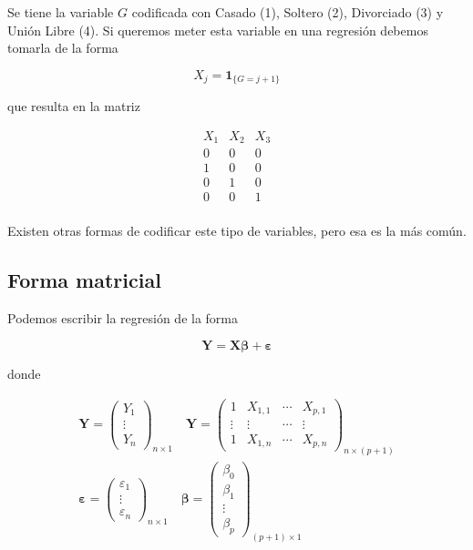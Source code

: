 \documentclass[
  12pt,
]{book}
\theoremstyle{definition}
\theoremstyle{definition}
\theoremstyle{definition}
\theoremstyle{remark}
\let\BeginKnitrBlock\begin \let\EndKnitrBlock\end
\begin{document}
\BeginKnitrBlock{example}
\protect\hypertarget{exm:unnamed-chunk-169}{}{\label{exm:unnamed-chunk-169} }Se tiene la variable \(G\) codificada con Casado (1), Soltero (2), Divorciado (3) y Unión Libre (4). Si queremos meter esta variable en una regresión debemos tomarla de la forma

\begin{equation*}
X_{j} = \mathbf{1}_{\{G=j+1\}} 
\end{equation*}

que resulta en la matriz

\begin{equation*}
\begin{matrix}
X_{1} & X_{2} & X_{3}\\
0 & 0 & 0 \\
1 & 0 & 0 \\
0 & 1 & 0 \\
0 & 0 & 1 \\
\end{matrix}
\end{equation*}

Existen otras formas de codificar este tipo de variables, pero esa es la más común.
\EndKnitrBlock{example}

\hypertarget{forma-matricial}{%
\subsection{Forma matricial}\label{forma-matricial}}

Podemos escribir la regresión de la forma

\begin{equation*}
\boldsymbol{Y} = \boldsymbol{X}\boldsymbol{\beta} + \boldsymbol{\varepsilon}
\end{equation*}

donde

\begin{multline*}
\boldsymbol{Y} = 
\begin{pmatrix}
Y_{1} \\
\vdots \\
Y_{n}
\end{pmatrix}_{n\times 1} 
\quad 
\boldsymbol{Y} = 
\begin{pmatrix}
1 & X_{1,1} & \cdots & X_{p,1} \\
\vdots & \vdots & \cdots & \vdots\\
1 & X_{1,n}& \cdots & X_{p,n}
\end{pmatrix}_{n\times (p+1)}
\\
\boldsymbol{\varepsilon} = 
\begin{pmatrix}
\varepsilon_{1} \\
\vdots \\
\varepsilon_{n}
\end{pmatrix}_{n\times 1} 
\quad 
\boldsymbol{\beta} = 
\begin{pmatrix}
\beta_{0} \\
\beta_{1} \\
\vdots \\
\beta_{p}
\end{pmatrix}_{(p+1)\times 1} 
\end{multline*}
\end{document}
